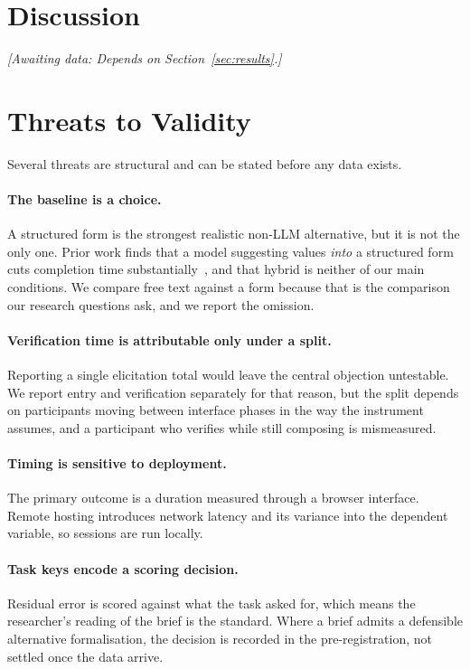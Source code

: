 \documentclass[acmsmall,screen,review,anonymous]{acmart}
\newcommand{\awaitingdata}[1]{%
  \par\noindent\textit{[Awaiting data: #1]}\par}
\begin{document}
\section{Discussion}
\awaitingdata{Depends on Section~\ref{sec:results}.}

\section{Threats to Validity}

Several threats are structural and can be stated before any data exists.

\paragraph{The baseline is a choice.} A structured form is the strongest
realistic non-LLM alternative, but it is not the only one. Prior work finds
that a model suggesting values \emph{into} a structured form cuts completion
time substantially~\cite{acm2025formcompletion}, and that hybrid is neither of
our main conditions. We compare free text against a form because that is the
comparison our research questions ask, and we report the omission.

\paragraph{Verification time is attributable only under a split.} Reporting a
single elicitation total would leave the central objection untestable. We
report entry and verification separately for that reason, but the split
depends on participants moving between interface phases in the way the
instrument assumes, and a participant who verifies while still composing is
mismeasured.

\paragraph{Timing is sensitive to deployment.} The primary outcome is a
duration measured through a browser interface. Remote hosting introduces
network latency and its variance into the dependent variable, so sessions are
run locally.

\paragraph{Task keys encode a scoring decision.} Residual error is scored
against what the task asked for, which means the researcher's reading of the
brief is the standard. Where a brief admits a defensible alternative
formalisation, the decision is recorded in the pre-registration, not settled
once the data arrive.
\end{document}
